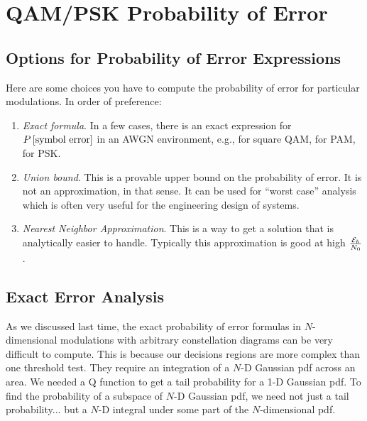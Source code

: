 



\section{QAM/PSK Probability of Error}



\subsection{Options for Probability of Error Expressions}

Here are some choices you have to compute the probability of error for particular modulations.  In order of preference:
\begin{enumerate}
 \item \textit{Exact formula}.  In a few cases, there is an exact expression for $P\left[{\mbox{symbol error}}\right]$ in an AWGN environment, e.g., for square QAM, for PAM, for PSK.
 \item \textit{Union bound}.  This is a provable upper bound on the probability of error.  It is not an approximation, in that sense.  It can be used for ``worst case'' analysis which is often very useful for the engineering design of systems.
 \item \textit{Nearest Neighbor Approximation}.  This is a way to get a solution that is analytically easier to handle.  Typically this approximation is good at high $\frac{\mathcal{E}_b}{N_0}$.
\end{enumerate}



\subsection{Exact Error Analysis}

As we discussed last time, the exact probability of error formulas in $N$-dimensional modulations with arbitrary constellation diagrams can be very difficult to compute.  This is because our decisions regions are more complex than one threshold test.  They require an integration of a $N$-D Gaussian pdf across an area.  We needed a Q function to get a tail probability for a 1-D Gaussian pdf.  To find the probability of a subspace of $N$-D Gaussian pdf, we need not just a tail probability... but a $N$-D integral under some part of the $N$-dimensional pdf.

